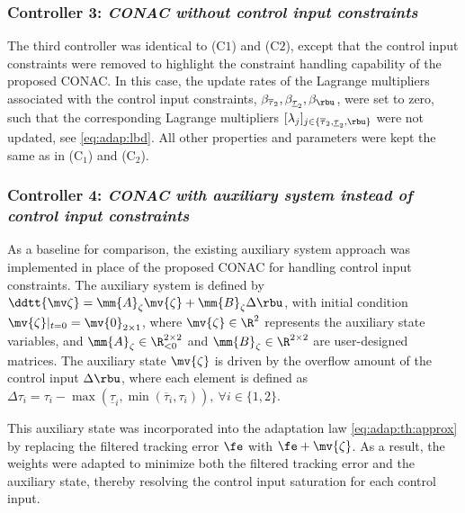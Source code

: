 \documentclass[journal]{IEEEtran}
\begin{document}
\subsubsection*{Controller 3:  \textit{CONAC without control input constraints}}

The third controller was identical to (C$1$) and (C$2$), except that the control input constraints were removed to highlight the constraint handling capability of the proposed CONAC.
In this case, the update rates of the Lagrange multipliers associated with the control input constraints, \ie $\beta_{\overline{\tau}_2},\beta_{\underline{\tau}_2},\beta_{\rbu}$, were set to zero, such that the corresponding Lagrange multipliers $[\lambda_j]_{j\in\{\overline{\tau}_2,\underline{\tau}_2,\rbu\}}$ were not updated, see \eqref{eq:adap:lbd}.
All other properties and parameters were kept the same as in (C$_1$) and (C$_2$).

\subsubsection*{Controller 4:  \textit{CONAC with auxiliary system instead of control input constraints}}

As a baseline for comparison, the existing auxiliary system approach \cite{Esfandiari:2014aa, Karason:1994aa, Esfandiari:2015aa} was implemented in place of the proposed CONAC for handling control input constraints.
The auxiliary system is defined by $\ddtt{\mv\zeta} = \mm{A}_\zeta \mv{\zeta} + \mm{B}_\zeta \Delta\rbu$, with initial condition $\mv{\zeta}\vert_{t=0} = \mv{0}_{2\times1}$, where $\mv{\zeta}\in\R^2$ represents the auxiliary state variables, and $\mm{A}_\zeta\in\R_{<0}^{2\times 2}$ and $\mm{B}_\zeta\in\R^{2\times 2}$ are user-designed matrices.
The auxiliary state $\mv{\zeta}$ is driven by the overflow amount of the control input $\Delta\rbu$, where each element is defined as $\Delta\tau_{i} = \tau_{i}-\max(\underline\tau_i,\min(\overline\tau_i,\tau_i)),\ \forall i\in\{1,2\}$.

This auxiliary state was incorporated into the adaptation law \eqref{eq:adap:th:approx} by replacing the filtered tracking error $\fe$ with $\fe+\mv{\zeta}$.
As a result, the weights were adapted to minimize both the filtered tracking error and the auxiliary state, thereby resolving the control input saturation for each control input.
\end{document}

